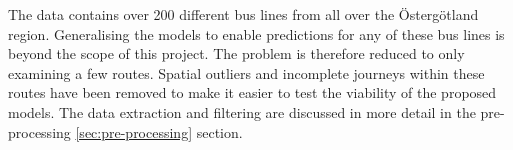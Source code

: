 The data contains over 200 different bus lines from all over the Östergötland region. Generalising the models to enable predictions for any of these bus lines is beyond the scope of this project. The problem is therefore reduced to only examining a few routes. Spatial outliers and incomplete journeys within these routes have been removed to make it easier to test the viability of the proposed models. The data extraction and filtering are discussed in more detail in the pre-processing \ref{sec:pre-processing} section.




